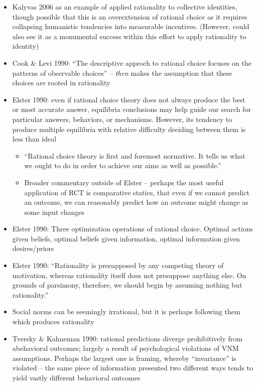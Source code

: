 \documentclass[12pt]{article}
\begin{document}
\begin{itemize}
    \item Kalyvas 2006 as an example of applied rationality to collective identities, though possible that this is an overextension of rational choice as it requires collapsing humanistic tendencies into measurable incentives. (However, could also see it as a monumental success within this effort to apply rationality to identity)
    \item Cook \& Levi 1990: ``The descriptive approch to rational choice focuses on the patterns of observable choices'' -- \emph{then} makes the assumption that these choices are rooted in rationality
    \item Elster 1990: even if rational choice theory does not always produce the best or most accurate answer, equilibria conclusions may help guide our search for particular answers, behaviors, or mechanisms. However, its tendency to produce multiple equilibria with relative difficulty deciding between them is less than ideal
    \begin{itemize}
        \item ``Rational choice theory is first and foremost normative. It tells us what we ought to do in order to achieve our aims as well as possible.''
        \item Broader commentary outside of Elster -- perhaps the most useful application of RCT is comparative statics, that even if we cannot predict an outcome, we can reasonably predict how an outcome might change as some input changes
    \end{itemize}
    \item Elster 1990: Three optimization operations of rational choice. Optimal actions given beliefs, optimal beliefs given information, optimal information given desires/priors
    \item Elster 1990: ``Rationality is presupposed by any competing theory of motivation, whereas rationality itself does not presuppose anything else. On grounds of parsimony, therefore, we should begin by assuming nothing but rationality.''
    \item Social norms can be seemingly irrational, but it is perhaps following them which produces rationality
    \item Tversky \& Kahneman 1990: rational predictions diverge prohibitively from abehavioral outcomes; largely a result of psychological violations of VNM assumptions. Perhaps the largest one is framing, whereby ``invariance'' is violated -- the same piece of information presented two different ways tends to yield vastly different behavioral outcomes

\end{itemize}
\end{document}
